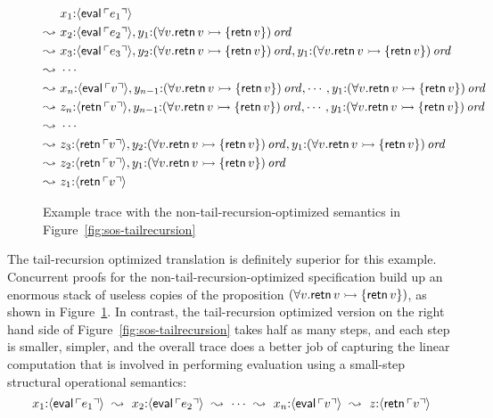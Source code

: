 \begin{figure}
\begin{align*}
& x_1{:}\langle {{\sf eval}\,{\ulcorner{e_1}\urcorner}} \rangle 
\\
\leadsto ~ & x_2{:}\langle {{\sf eval}\,{\ulcorner{e_2}\urcorner}} \rangle, 
  y_1{:}{(\forall v. {\sf retn}\,v \rightarrowtail \{ {\sf retn}\,v \})}\,{{\it ord}} 
\\
\leadsto ~ & x_3{:}\langle {{\sf eval}\,{\ulcorner{e_3}\urcorner}} \rangle, 
  y_2{:}{(\forall v. {\sf retn}\,v \rightarrowtail \{ {\sf retn}\,v \})}\,{{\it ord}}, 
  y_1{:}{(\forall v. {\sf retn}\,v \rightarrowtail \{ {\sf retn}\,v \})}\,{{\it ord}} 
\\
\leadsto ~ & \cdots
\\
\leadsto ~ & x_n{:}\langle {{\sf eval}\,{\ulcorner{v}\urcorner}} \rangle, 
  y_{n-1}{:}{(\forall v. {\sf retn}\,v \rightarrowtail \{ {\sf retn}\,v \})}\,{{\it ord}}, 
  \cdots,
  y_1{:}{(\forall v. {\sf retn}\,v \rightarrowtail \{ {\sf retn}\,v \})}\,{{\it ord}} 
\\
\leadsto ~ & z_n{:}\langle {{\sf retn}\,{\ulcorner{v}\urcorner}} \rangle, 
  y_{n-1}{:}{(\forall v. {\sf retn}\,v \rightarrowtail \{ {\sf retn}\,v \})}\,{{\it ord}}, 
  \cdots,
  y_1{:}{(\forall v. {\sf retn}\,v \rightarrowtail \{ {\sf retn}\,v \})}\,{{\it ord}} 
\\
\leadsto ~ & \cdots 
\\
\leadsto ~ & z_3{:}\langle {{\sf retn}\,{\ulcorner{v}\urcorner}} \rangle, 
  y_2{:}{(\forall v. {\sf retn}\,v \rightarrowtail \{ {\sf retn}\,v \})}\,{{\it ord}}, 
  y_1{:}{(\forall v. {\sf retn}\,v \rightarrowtail \{ {\sf retn}\,v \})}\,{{\it ord}} 
\\
\leadsto ~ & z_2{:}\langle {{\sf retn}\,{\ulcorner{v}\urcorner}} \rangle, 
  y_1{:}{(\forall v. {\sf retn}\,v \rightarrowtail \{ {\sf retn}\,v \})}\,{{\it ord}} \\
\leadsto ~ & z_1{:}\langle {{\sf retn}\,{\ulcorner{v}\urcorner}} \rangle
\end{align*}
\caption{Example trace with the non-tail-recursion-optimized
  semantics in Figure~\ref{fig:sos-tailrecursion}}
\label{fig:example-proc-non-tail-recursive-trace}
\end{figure}

The tail-recursion optimized translation is definitely superior for
this example. Concurrent proofs for the non-tail-recursion-optimized
specification build up an enormous stack of useless copies of the
proposition $(\forall v. {\sf retn}\,v \rightarrowtail \{ {\sf retn}\,v \})$,
as shown in Figure~\ref{fig:example-proc-non-tail-recursive-trace}.
In contrast, the tail-recursion optimized version on the right hand
side of Figure~\ref{fig:sos-tailrecursion} takes half as many steps,
and each step is smaller, simpler, and the overall trace does a better
job of capturing the linear computation that is involved in performing
evaluation using a small-step structural operational semantics:
\[
x_1{:}\langle {{\sf eval}\,{\ulcorner{e_1}\urcorner}} \rangle
 ~\leadsto~
x_2{:}\langle {{\sf eval}\,{\ulcorner{e_2}\urcorner}} \rangle
 ~\leadsto~ \cdots ~\leadsto~
x_n{:}\langle {{\sf eval}\,{\ulcorner{v}\urcorner}} \rangle
 ~\leadsto~ 
z{:}\langle {{\sf retn}\,{\ulcorner{v}\urcorner}} \rangle
\]

